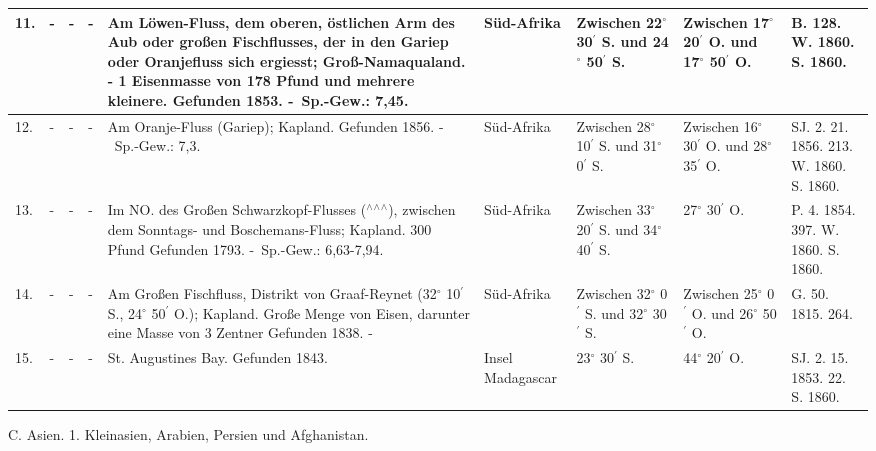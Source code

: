 \documentclass[a4paper, 11pt, oneside, polutonikogreek, german]{article}
\begin{document}
\begin{table}[!ht]
\begin{tabular}{|l|l|l|l|l|l|l|l|l|}
        11. & - & - & - & Am Löwen-Fluss, dem oberen, östlichen Arm des Aub oder großen Fischflusses, der in den Gariep oder Oranjefluss sich ergiesst; Groß-Namaqualand. - 1 Eisenmasse von 178 Pfund und mehrere kleinere. Gefunden 1853. - Sp.-Gew.: 7,45. & Süd-Afrika & Zwischen 22$^\circ$ 30$^\prime$ S. und 24$^\circ$ 50$^\prime$ S. & Zwischen 17$^\circ$ 20$^\prime$ O. und 17$^\circ$ 50$^\prime$ O. & B. 128. W. 1860. S. 1860. \\ \hline
        12. & - & - & - & Am Oranje-Fluss (Gariep); Kapland. Gefunden 1856. - Sp.-Gew.: 7,3. & Süd-Afrika & Zwischen 28$^\circ$ 10$^\prime$ S. und 31$^\circ$ 0$^\prime$ S. & Zwischen 16$^\circ$ 30$^\prime$ O. und 28$^\circ$ 35$^\prime$ O. & SJ. 2. 21. 1856. 213. W. 1860. S. 1860. \\ \hline
        13. & - & - & - & Im NO. des Großen Schwarzkopf-Flusses ($^\wedge$$^\wedge$$^\wedge$), zwischen dem Sonntags- und Boschemans-Fluss; Kapland. 300 Pfund Gefunden 1793. - Sp.-Gew.: 6,63-7,94. & Süd-Afrika & Zwischen 33$^\circ$ 20$^\prime$ S. und 34$^\circ$ 40$^\prime$ S. & 27$^\circ$ 30$^\prime$ O. & P. 4. 1854. 397. W. 1860. S. 1860. \\ \hline
        14. & - & - & - & Am Großen Fischfluss, Distrikt von Graaf-Reynet (32$^\circ$ 10$^\prime$ S., 24$^\circ$ 50$^\prime$ O.); Kapland. Große Menge von Eisen, darunter eine Masse von 3 Zentner Gefunden 1838. - & Süd-Afrika & Zwischen 32$^\circ$ 0$^\prime$ S. und 32$^\circ$ 30$^\prime$ S. & Zwischen 25$^\circ$ 0$^\prime$ O. und 26$^\circ$ 50$^\prime$ O. & G. 50. 1815. 264. \\ \hline
        15. & - & - & - & St. Augustines Bay. Gefunden 1843. & Insel Madagascar & 23$^\circ$ 30$^\prime$ S. & 44$^\circ$ 20$^\prime$ O. & SJ. 2. 15. 1853. 22. S. 1860. \\ \hline
    \end{tabular}
\end{table}
\clearpage
C. Asien.
1. Kleinasien, Arabien, Persien und Afghanistan.
\end{document}
